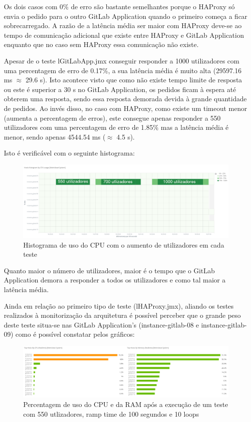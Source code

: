 \documentclass{article}
\begin{document}
Os dois casos com 0\% de erro são bastante semelhantes porque o HAProxy só envia o pedido para o outro GitLab Application quando o primeiro começa a ficar sobrecarregado. A razão de a latência média ser maior com HAProxy deve-se ao tempo de comunicação adicional que existe entre HAProxy e GitLab Application enquanto que no caso sem HAProxy essa comunicação não existe.

Apesar de o teste lGitLabApp.jmx conseguir responder a 1000 utilizadores com uma percentagem de erro de 0.17\%, a sua latência média é muito alta (29597.16 ms $\approx$ 29.6 s). Isto acontece visto que como não existe tempo limite de resposta ou este é superior a 30 s no GitLab Application, os pedidos ficam à espera até obterem uma resposta, sendo essa resposta demorada devida à grande quantidade de pedidos. Ao invés disso, no caso com HAProxy, como existe um timeout menor (aumenta a percentagem de erros), este consegue apenas responder a 550 utilizadores com uma percentagem de erro de 1.85\% mas a latência média é menor, sendo apenas 4544.54 ms ($\approx$ 4.5 s).

Isto é verificável com o seguinte histograma:

\begin{figure}[H]
    \centering
    \includegraphics[width=15cm]{histAv.png}
    \caption{Histograma de uso do CPU com o aumento de utilizadores em cada teste}
\end{figure}

Quanto maior o número de utilizadores, maior é o tempo que o GitLab Application demora a responder a todos os utilizadores e como tal maior a latência média.

Ainda em relação ao primeiro tipo de teste (lHAProxy.jmx), aliando os testes realizados à monitorização da arquitetura é possível perceber que o grande peso deste teste situa-se nas GitLab Application's (instance-gitlab-08 e instance-gitlab-09) como é possível constatar pelos gráficos:

\begin{figure}[H]
    \centering
    \includegraphics[width=15cm]{cpuMem.png}
    \caption{Percentagem de uso do CPU e da RAM após a execução de um teste com 550 utlizadores, ramp time de 100 segundos e 10 loops}
\end{figure}
\end{document}
